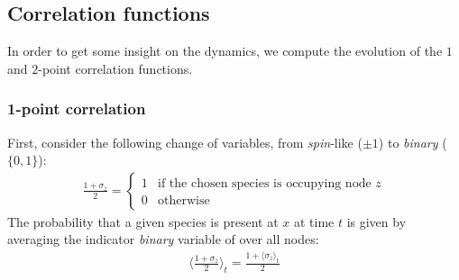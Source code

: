 \documentclass[../../main.tex]{subfiles}
\begin{document}
\subsection{Correlation functions}
In order to get some insight on the dynamics, we compute the evolution of the $1$ and $2$-point correlation functions.

\subsubsection{1-point correlation}

First, consider the following change of variables, from \textit{spin}-like ($\pm 1$) to \textit{binary} ($\{0,1\}$):
\begin{align}\label{eqn:presence-indicator}
    \frac{1+\sigma_z}{2} = \begin{cases}
        1 & \text{if the chosen species is occupying node $z$}\\
        0 & \text{otherwise}
    \end{cases} 
\end{align}  
The probability that a given species is present at $x$ at time $t$ is given by averaging the indicator \textit{binary} variable of  over all nodes:
\begin{align*}
    \langle \frac{1+ \sigma_z}{2}  \rangle_t = \frac{1+\langle \sigma_z \rangle_t}{2} 
\end{align*}
\end{document}
